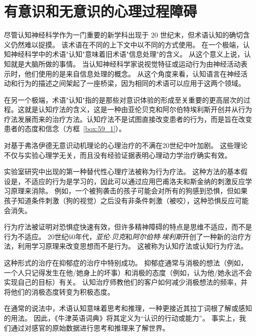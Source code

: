 \chapter{有意识和无意识的心理过程障碍} \label{chap:chap59}

尽管认知神经科学作为一门重要的新学科出现于 20 世纪末，但术语认知的确切含义仍然难以捉摸。 
该术语在不同的上下文中以不同的方式使用。
在一个极端，认知神经科学中的术语"认知"意味着旧术语"信息处理"的含义。
从这个意义上说，认知就是大脑所做的事情。
当认知神经科学家说视觉特征或运动行为由神经活动表示时，他们使用的是来自信息处理的概念。
从这个角度来看，认知语言在神经活动和行为的描述之间架起了一座桥梁，因为相同的术语可以应用于这两个领域。


在另一个极端，术语"认知"指的是那些对意识体验的形成至关重要的更高层次的过程。这就是认知疗法的含义，这是一种由亚伦贝克和阿尔伯特埃利斯开创并从行为疗法发展而来的治疗方法。认知疗法不是试图直接改变患者的行为，而是旨在改变患者的态度和信念（方框~\ref{box:59_1}）。



\begin{proposition}[认知疗法] \label{box:59_1}
	
	\quad \quad 对基于弗洛伊德无意识动机理论的心理治疗的不满在20世纪中叶加剧。
	这些理论不仅与实验心理学无关，而且没有经验证据表明心理动力学治疗确实有效。
	
	\quad \quad 实验室研究中出现的第一种替代性心理疗法被称为行为疗法。
	这种方法的基本假设是，不适应的行为是学习的，因此可以通过应用巴甫洛夫和斯金纳的刺激反应学习原理来消除。
	例如，一个被狗袭击的孩子可能会对所有的狗感到恐惧，但如果孩子知道条件刺激（狗的视觉）之后没有非条件刺激（被咬），这种恐惧反应可能会消失。
	
	\quad \quad 行为疗法被证明对恐惧症快速有效，但许多精神障碍的特点是思维不适应，而不是行为不适应。
	20世纪60年代，\textit{亚伦$\cdot$贝克}和\textit{阿尔伯特$\cdot$埃利斯}开创了一种新的治疗方法，利用学习原理来改变思想而不是行为。
	这被称为认知疗法或认知行为疗法。
	
	\quad \quad 这种形式的治疗在抑郁症的治疗中特别成功。
	抑郁症通常与消极的想法（例如，一个人只记得发生在他/她身上的坏事）和消极的态度（例如，认为他/她永远不会实现自己的目标）有关。
	认知治疗师教他们的客户如何减少消极想法的频率，并将他们的消极态度转变为积极态度。
	
\end{proposition}



在通常的说法中，术语认知意味着思考和推理，一种更接近其拉丁词根了解或感知的用法。
因此，《牛津英语词典》将其定义为“认识的行动或能力”。
事实上，我们通过对感官的原始数据进行思考和推理来了解世界。


